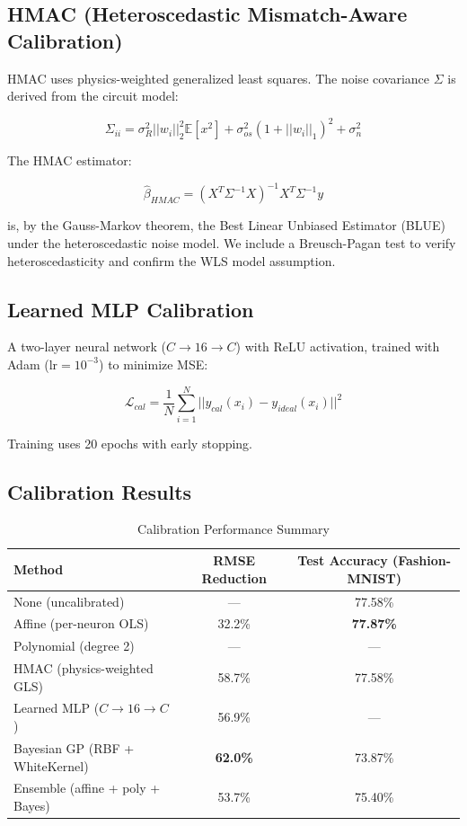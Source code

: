 \documentclass[10pt,twocolumn]{article}
\begin{document}
\subsection{HMAC (Heteroscedastic Mismatch-Aware Calibration)}

HMAC uses physics-weighted generalized least squares. The noise covariance $\Sigma$ is derived from the circuit model:

\begin{equation}
\Sigma_{ii} = \sigma_R^2 ||w_i||_2^2 \mathbb{E}[x^2] + \sigma_{os}^2 (1 + ||w_i||_1)^2 + \sigma_n^2
\end{equation}

The HMAC estimator:

\begin{equation}
\hat{\beta}_{HMAC} = (X^T \Sigma^{-1} X)^{-1} X^T \Sigma^{-1} y
\end{equation}

is, by the Gauss-Markov theorem, the Best Linear Unbiased Estimator (BLUE) under the heteroscedastic noise model. We include a Breusch-Pagan test to verify heteroscedasticity and confirm the WLS model assumption.

\subsection{Learned MLP Calibration}

A two-layer neural network ($C \to 16 \to C$) with ReLU activation, trained with Adam ($\text{lr} = 10^{-3}$) to minimize MSE:

\begin{equation}
\mathcal{L}_{cal} = \frac{1}{N} \sum_{i=1}^N ||y_{cal}(x_i) - y_{ideal}(x_i)||^2
\end{equation}

Training uses 20 epochs with early stopping.

\subsection{Calibration Results}

\begin{table}[t]
  \centering
  \caption{Calibration Performance Summary}
  \label{tab:calibration}
  \begin{tabular}{lcc}
    \toprule
    Method & RMSE Reduction & Test Accuracy (Fashion-MNIST) \\
    \midrule
    None (uncalibrated) & --- & 77.58\% \\
    Affine (per-neuron OLS) & 32.2\% & \textbf{77.87\%} \\
    Polynomial (degree 2) & --- & --- \\
    HMAC (physics-weighted GLS) & 58.7\% & 77.58\% \\
    Learned MLP ($C \to 16 \to C$) & 56.9\% & --- \\
    Bayesian GP (RBF + WhiteKernel) & \textbf{62.0\%} & 73.87\% \\
    Ensemble (affine + poly + Bayes) & 53.7\% & 75.40\% \\
    \bottomrule
  \end{tabular}
\end{table}
\end{document}
